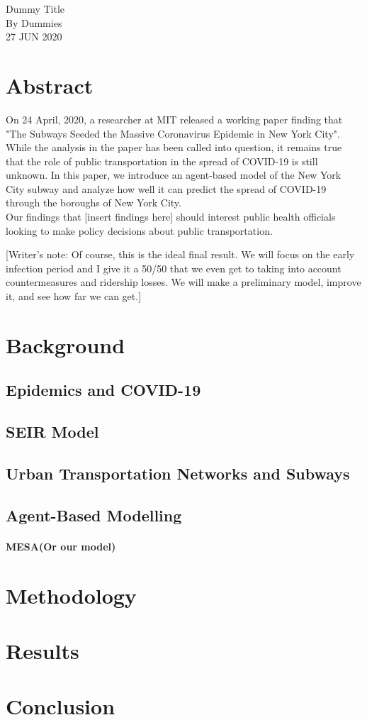 \documentclass[12pt, a4, epsf] {article}
\theoremstyle{plain}
\theoremstyle{definition}
\begin{document}
\begin{center}

{\Large Dummy Title\\}
By Dummies \\
27 JUN 2020
\end{center}
\section*{Abstract}
On 24 April, 2020, a researcher at MIT released a working paper finding that "The Subways Seeded the Massive Coronavirus Epidemic in New York City". While the analysis in the paper has been called into question, it remains true that the role of public transportation in the spread of COVID-19 is still unknown. In this paper, we introduce an agent-based model of the New York City subway and analyze how well it can predict the spread of COVID-19 through the boroughs of New York City.\\

Our findings that [insert findings here] should interest public health officials looking to make policy decisions about public transportation.

[Writer's note: Of course, this is the ideal final result. We will focus on the early infection period and I give it a 50/50 that we even get to taking into account countermeasures and ridership losses. We will make a preliminary model, improve it, and see how far we can get.]

\section*{Background}
\subsection*{Epidemics and COVID-19}
\subsection*{SEIR Model}
\subsection*{Urban Transportation Networks and Subways}
\subsection*{Agent-Based Modelling}
\paragraph*{MESA(Or our model)}
\section*{Methodology}
\section*{Results}
\section*{Conclusion}
\nocite{*}
{}

\end{document}
